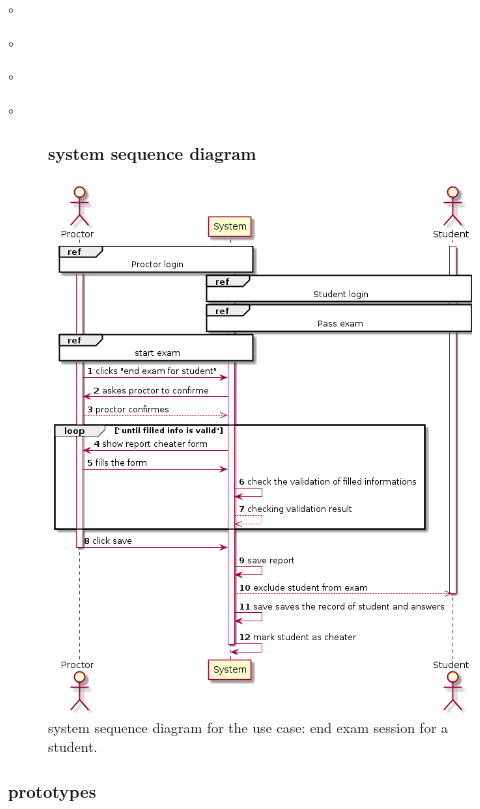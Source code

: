 \documentclass[]{uc2pfecaneva}
\begin{document}
\begin{list}{$\circ$}{}
\begin{list}{$\circ$}{}
\begin{list}{$\circ$}{}
\begin{list}{$\circ$}{}
\begin{figure}[h]
        \subsubsection{system sequence diagram}
        \centering
        \includegraphics[width=\textwidth]{images/End_exam_for_student}

        \caption{system sequence diagram for the use case: end exam session for a student.}
    \end{figure}
    \clearpage

    \subsubsection{prototypes}
    \begin{figure}[h]


\end{figure}
\end{list}
\end{list}
\end{list}
\end{list}
\end{document}
